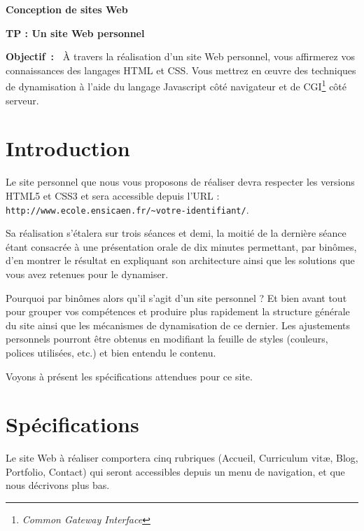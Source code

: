 \documentclass[a4paper,12pt]{article}
\begin{document}
\parindent0pt\parskip\smallskipamount

\begin{center}
  \textbf{\Large{Conception de sites Web}}\par\smallskip
  \textbf{\large{TP  : \og{}Un site Web personnel\fg{}}}\par\smallskip
\end{center}\bigskip

\textbf{Objectif~:~} \`{A} travers la réalisation d'un site Web personnel, 
vous affirmerez vos connaissances des langages HTML et CSS. Vous mettrez en 
\oe uvre des techniques de dynamisation à l'aide du langage Javascript côté 
navigateur et de CGI\footnote{\emph{Common Gateway Interface}} côté serveur.

\section{Introduction}\label{sec:introduction}
Le site personnel que nous vous proposons de réaliser devra respecter les 
versions HTML5 et CSS3 et sera accessible depuis l'URL :\\
\texttt{http://www.ecole.ensicaen.fr/\textasciitilde votre-identifiant/}. 

Sa réalisation s'étalera sur trois séances et demi, la moitié de la dernière 
séance étant consacrée à une présentation orale de dix minutes permettant, 
par binômes, d'en montrer le résultat en expliquant son architecture ainsi 
que les solutions que vous avez retenues pour le dynamiser.

Pourquoi par binômes alors qu'il s'agit d'un site personnel ? Et bien avant
tout pour grouper vos compétences et produire plus rapidement la structure 
générale du site ainsi que les mécanismes de dynamisation de ce dernier. Les 
ajustements personnels pourront être obtenus en modifiant la feuille de styles
(couleurs, polices utilisées, etc.) et bien entendu le contenu.  

Voyons à présent les spécifications attendues pour ce site. 

\section{Spécifications}\label{sec:specifications}
Le site Web à réaliser comportera cinq rubriques (\og{}Accueil\fg{}, 
\og{}Curriculum vit\ae\fg{}, \og{}Blog\fg{}, \og{}Portfolio\fg{},  
\og{}Contact\fg{}) qui seront accessibles depuis un menu de navigation, et
que nous décrivons plus bas.
\end{document}
